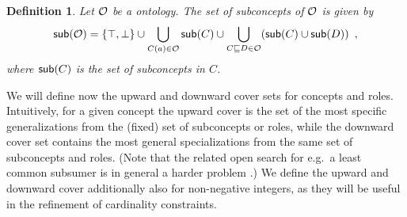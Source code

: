 \documentclass[
]{ceurart}
\newtheorem{definition}{Definition}
\begin{document}
\begin{definition}
  Let $\mathcal{O}$ be a \SROIQ ontology. The set of \emph{subconcepts} of $\mathcal{O}$ is given by 
  {\footnotesize
  \begin{align*}
    \mathop{\mathsf{sub}}(\mathcal{O}) = \{\top, \bot\} \cup \bigcup_{C(a) \in \mathcal{O}} \mathop{\mathsf{sub}}(C) \cup \bigcup_{C \sqsubseteq D \in \mathcal{O}} ( \mathop{\mathsf{sub}}(C) \cup \mathop{\mathsf{sub}}(D) ) \enspace,
  \end{align*}
  }
  where $\mathop{\mathsf{sub}}(C)$ is the set of \emph{subconcepts} in $C$.
\end{definition}

We will define now the upward and downward cover sets for concepts and roles. Intuitively, for a given concept the upward cover is the set of the most specific generalizations from the (fixed) set of subconcepts or roles, while the downward cover set contains the most general specializations from the same set of subconcepts and roles. (Note that the related open search for e.g.\ a least common subsumer is in general a harder problem \cite{baader2003least}.) We define the upward and downward cover additionally also for non-negative integers, as they will be useful in the refinement of cardinality constraints.
\end{document}

